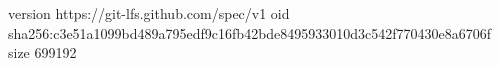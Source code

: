 version https://git-lfs.github.com/spec/v1
oid sha256:c3e51a1099bd489a795edf9c16fb42bde8495933010d3c542f770430e8a6706f
size 699192
